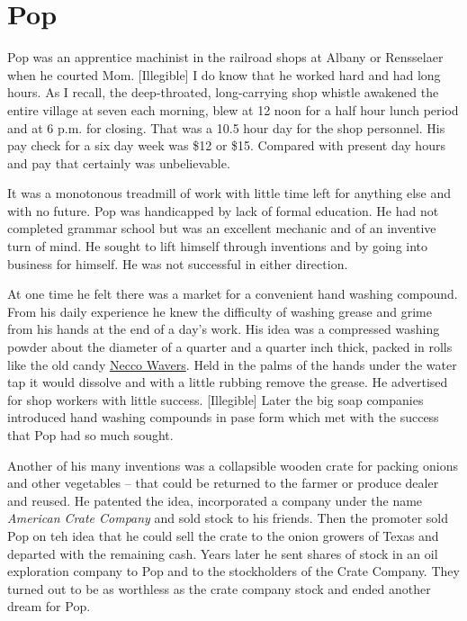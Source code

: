 \documentclass[12pt]{book}              %
\begin{document}
\section*{Pop}

Pop was an apprentice machinist in the railroad shops at Albany or Rensselaer when he courted Mom. [Illegible] I do know that he worked hard and had long hours. As I recall, the deep-throated, long-carrying shop whistle awakened the entire village at seven each morning, blew at 12 noon for a half hour lunch period and at 6 p.m. for closing. That was a 10.5 hour day for the shop personnel. His pay check for a six day week was \$12 or \$15. Compared with present day hours and pay that certainly was unbelievable. 

It was a monotonous treadmill of work with little time left for anything else and with no future. Pop was handicapped by lack of formal education. He had not completed grammar school but was an excellent mechanic and of an inventive turn of mind. He sought to lift himself through inventions and by going into business for himself. He was not successful in either direction. 

At one time he felt there was a market for a convenient hand washing compound. From his daily experience he knew the difficulty of washing grease and grime from his hands at the end of a day's work. His idea was a compressed washing powder about the diameter of a quarter and a quarter inch thick, packed in rolls like the old candy \href{http://en.wikipedia.org/wiki/Necco_Wafers}{Necco Wavers}. Held in the palms of the hands under the water tap it would dissolve and with a little rubbing remove the grease. He advertised for shop workers with little success. [Illegible] Later the big soap companies introduced hand washing compounds in pase form which met with the success that Pop had so much sought. 

Another of his many inventions was a collapsible wooden crate for packing onions and other vegetables -- that could be returned to the farmer or produce dealer and reused. He patented the idea, incorporated a company under the name {\it American Crate Company} and sold stock to his friends. Then the promoter sold Pop on teh idea that he could sell the crate to the onion growers of Texas and departed with the remaining cash. Years later he sent shares of stock in an oil exploration company to Pop and to the stockholders of the Crate Company. They turned out to be as worthless as the crate company stock and ended another dream for Pop. 
\end{document}
